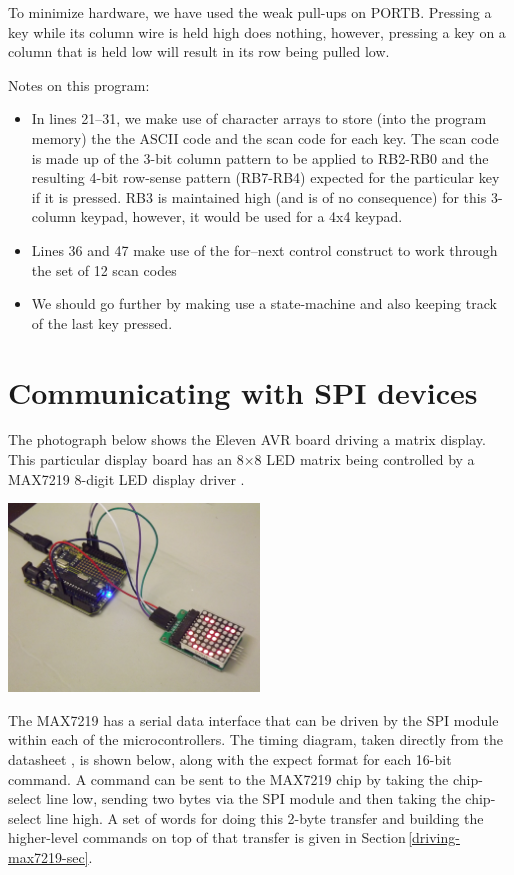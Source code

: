 \documentclass[12pt,a4paper]{article}
\newcommand{\code}[2]{
 \hrulefill
 \scriptsize
 
 \hrulefill
 \vspace{2em}
 \normalsize
}
\begin{document}
\medskip\noindent
To minimize hardware, we have used the weak pull-ups on PORTB.
Pressing a key while its column wire is held high does nothing, however,
pressing a key on a column that is held low will result in its row
being pulled low.

\bigskip\noindent
\code{}{../pic18/keypad.txt}

\noindent
Notes on this program:
\begin{itemize}
  \item In lines 21--31, we make use of character arrays to store (into the program memory)
    the the ASCII code and the scan code for each key.
    The scan code is made up of the 3-bit column pattern to be applied to RB2-RB0 and the
    resulting 4-bit row-sense pattern (RB7-RB4) expected for the particular key if it is pressed.
    RB3 is maintained high (and is of no consequence) for this 3-column keypad, however, 
    it would be used for a 4x4 keypad.
  \item Lines 36 and 47 make use of the for--next control construct to work through 
    the set of 12 scan codes
  \item We should go further by making use a state-machine 
    and also keeping track of the last key pressed.
\end{itemize}


\newpage
\section{Communicating with SPI devices}
%
The photograph below shows the Eleven AVR board driving a matrix display.
This particular display board has an 8$\times$8 LED matrix being controlled by
a MAX7219 8-digit LED display driver \cite{max7219-datasheet}.

\medskip
\centerline{
\includegraphics[height=5cm]{../figs/eleven-driving-MAX7219-LED-matrix.jpeg}
}

\medskip\noindent
The MAX7219 has a serial data interface that can be driven by the SPI module
within each of the microcontrollers.
The timing diagram, taken directly from the datasheet \cite{max7219-datasheet}, 
is shown below, along with the expect format for each 16-bit command.
A command can be sent to the MAX7219 chip by taking the chip-select line low,
sending two bytes via the SPI module and then taking the chip-select line high.
A set of words for doing this 2-byte transfer and building the higher-level commands
on top of that transfer is given in Section\,\ref{driving-max7219-sec}.
\end{document}
